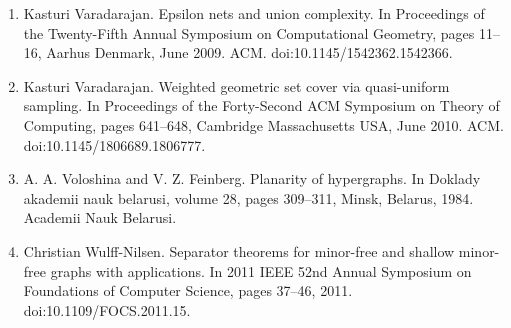 \begin{enumerate}
\item[]  [62]  Kasturi Varadarajan.  Epsilon nets and union complexity.  In Proceedings of the Twenty-Fifth Annual Symposium on Computational Geometry, pages 11–16, Aarhus Denmark, June 2009. ACM.  doi:10.1145/1542362.1542366.  
\item[]  [63]  Kasturi Varadarajan.  Weighted geometric set cover via quasi-uniform sampling.  In Proceedings of the Forty-Second ACM Symposium on Theory of Computing, pages 641–648, Cambridge Massachusetts USA, June 2010. ACM.  doi:10.1145/1806689.1806777.  
\item[]  [64]  A. A. Voloshina and V. Z. Feinberg.  Planarity of hypergraphs.  In Doklady akademii nauk belarusi, volume 28, pages 309–311, Minsk, Belarus, 1984. Academii Nauk Belarusi.  
\item[]  [65]  Christian Wulff-Nilsen.  Separator theorems for minor-free and shallow minor-free graphs with applications.  In 2011 IEEE 52nd Annual Symposium on Foundations of Computer Science, pages 37–46, 2011.  doi:10.1109/FOCS.2011.15.  
\end{enumerate}
